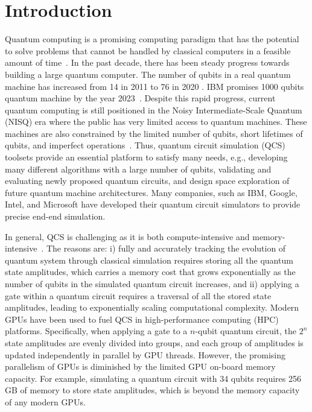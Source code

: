 \section{Introduction}
\label{sec:intro}
Quantum computing is a promising computing paradigm that has the potential to solve problems that cannot be handled by classical computers in a feasible amount of time~\cite{10.1038/s41567-018-0124-x}. In the past decade, there has been steady progress towards building a large quantum computer. The number of qubits in a real quantum machine has increased from 14 in 2011 \cite{10.1103/PhysRevLett.106.130506} to 76 in 2020 \cite{10.1126/science.abe8770}. 
IBM promises 1000 qubits quantum machine by the year 2023~\cite{IBM2023}. 
Despite this rapid progress, current quantum computing is still positioned in the Noisy Intermediate-Scale Quantum (NISQ) era where the public has very limited access to quantum machines. 
These machines are also constrained by the limited number of qubits, short lifetimes of qubits, and imperfect operations~\cite{10.22331/q-2018-08-06-79}. 
Thus, quantum circuit simulation (QCS) toolsets provide an essential platform to satisfy many needs, e.g., developing many different algorithms with a large number of qubits, validating and evaluating newly proposed quantum circuits, and design space exploration of future quantum machine architectures. 
Many companies, such as IBM, Google, Intel, and Microsoft have developed their quantum circuit simulators to provide precise end-end simulation.  


In general, QCS is challenging as it is both compute-intensive and memory-intensive~\cite{10.1109/HPCA51647.2021.00026,10.1109/DAC18072.2020.9218591}. 
The reasons are: i) fully and accurately tracking the evolution of quantum system through classical simulation \cite{10.1007/978-3-031-01765-0} requires storing all the quantum state amplitudes, which carries a memory cost that grows exponentially as the number of qubits in the simulated quantum circuit increases, and ii) applying a gate within a quantum circuit requires a traversal of all the stored state amplitudes,  leading to exponentially scaling computational complexity.  
Modern GPUs have been used to fuel QCS in high-performance computing (HPC) platforms. Specifically, when applying a gate to a $n$-qubit quantum circuit, the $2^n$ state amplitudes are evenly divided into groups, and each group of amplitudes is updated independently in parallel by GPU threads. 
However, the promising parallelism of GPUs is diminished by the limited GPU on-board memory capacity. For example, simulating a quantum circuit with 34 qubits requires 256 GB of memory to store state amplitudes, which is beyond the memory capacity of any modern GPUs. 


